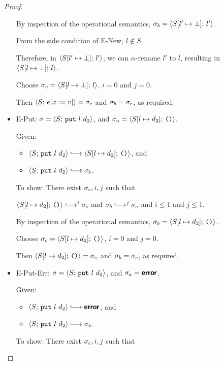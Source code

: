 \begin{proof}
\begin{itemize}
      By inspection of the operational semantics, $\sigma_b =
      \langle S[l' \mapsto \bot];\, l' \rangle$.

      From the side condition of {\sc E-New}, $l \notin S$.

      Therefore, in $\langle S[l' \mapsto \bot];\, l' \rangle$,
      we can $\alpha$-rename $l'$ to $l$, resulting in
      $\langle S[l \mapsto \bot];\, l \rangle$.

      Choose $\sigma_c = \langle S[l \mapsto \bot];\, l \rangle$,
      $i = 0$ and $j = 0$.

      Then $\langle S;\, e[x := v] \rangle = \sigma_c$ and $\sigma_b =
      \sigma_c$, as required.

    \item {\sc E-Put}: $\sigma = \langle S;\, \mbox{\texttt{put}}~l~d_2 \rangle$, and
      $\sigma_a = \langle S[l \mapsto d_2];\, \mbox{\texttt{()}} \rangle$.

      Given:
      \begin{itemize}
      \item $\config{S}{\putexp{l}{d_2}} \parstepsto
        \config{\extSRaw{S}{l}{d_2}}{\unit}$, and
      \item $\config{S}{\putexp{l}{d_2}} \parstepsto \conf_b$.
      \end{itemize}

      To show: There exist $\sigma_c, i, j$ such that

      $\config{\extSRaw{S}{l}{d_2}}{\unit} \parstepsto^i \conf_c$ and
      $\conf_b \parstepsto^j \conf_c$ and $i \leq 1$ and $j \leq 1$.

      By inspection of the operational semantics, $\sigma_b =
      \langle S[l \mapsto d_2];\, \mbox{\texttt{()}} \rangle$.

      Choose $\sigma_c = \langle S[l \mapsto d_2];\, \mbox{\texttt{()}} \rangle$, $i = 0$
      and $j = 0$.

      Then $\langle S[l \mapsto d_2];\, \mbox{\texttt{()}} \rangle = \sigma_c$ and $\sigma_b
      = \sigma_c$, as required.

    \item {\sc E-Put-Err}: $\sigma = \langle S;\, \mbox{\texttt{put}}~l~d_2 \rangle$, and
      $\sigma_a = \textbf{\textsf{error}}$.

      Given:
      \begin{itemize}
      \item $\config{S}{\putexp{l}{d_2}} \parstepsto \error$, and
      \item $\config{S}{\putexp{l}{d_2}} \parstepsto \conf_b$.
      \end{itemize}

      To show: There exist $\sigma_c, i, j$ such that


\end{itemize}
\end{proof}
